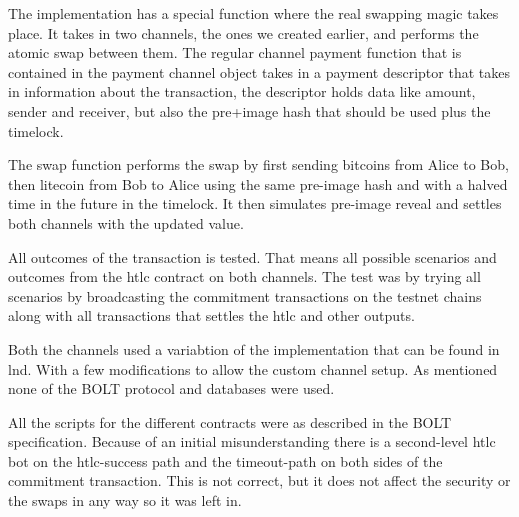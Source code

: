 The implementation has a special function where the real swapping magic takes place. 
It takes in two channels, the ones we created earlier, and performs the atomic swap between them.
The regular channel payment function that is contained in the payment channel object
takes in a payment descriptor that takes in information about the transaction, the 
descriptor holds data like amount, sender and receiver, but also the pre+image hash
that should be used plus the timelock.

The swap function performs the swap by first sending bitcoins from Alice to Bob, then litecoin 
from Bob to Alice using the same pre-image hash and with a halved time in the future in the timelock.
It then simulates pre-image reveal and settles both channels with the updated value.

All outcomes of the transaction is tested. That means all possible scenarios and outcomes from 
the htlc contract on both channels. The test was by trying all scenarios by broadcasting 
the commitment transactions on the testnet chains along with all transactions that settles the htlc
and other outputs. 

Both the channels used a variabtion of the implementation that can be found in lnd. With a few modifications
to allow the custom channel setup. As mentioned none of the BOLT protocol and databases were used. 

All the scripts for the different contracts were as described in the BOLT specification. 
Because of an initial misunderstanding there is a second-level htlc bot on the htlc-success path
and the timeout-path on both sides of the commitment transaction. This is not correct, but it
does not affect the security or the swaps in any way so it was left in.